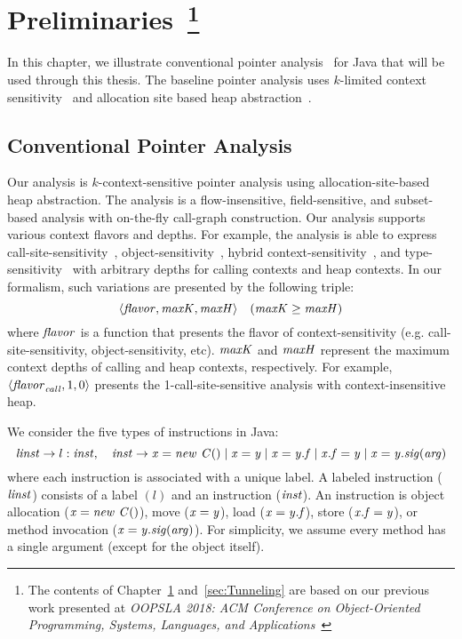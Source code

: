 \chapter{Preliminaries~\footnote{The contents of Chapter~\ref{sec:Preliminaries} and~\ref{sec:Tunneling} are based on our previous work presented at \emph{OOPSLA 2018: ACM Conference on Object-Oriented Programming, Systems, Languages, and Applications}~\cite{JeJeOh18}}}\label{sec:Preliminaries}
In this chapter, we illustrate conventional pointer analysis~\cite{Smaragdakis2015,KastrinisS13a} for Java that will be used through this thesis. 
The baseline pointer analysis uses $k$-limited context sensitivity~\cite{KastrinisS13a,Smaragdakis2011} and allocation site based heap abstraction~\cite{Smaragdakis2015,Tan2017}.



\section{Conventional Pointer Analysis}\label{pre:conventional-analysis}
Our analysis is $k$-context-sensitive pointer analysis using allocation-site-based heap abstraction.
The analysis is a flow-insensitive, field-sensitive, and subset-based
analysis with on-the-fly call-graph construction. 
Our analysis supports various context flavors and depths.
For example, the analysis is able to express
call-site-sensitivity~\cite{Shivers1988},
object-sensitivity~\cite{Milanova2005}, hybrid
context-sensitivity~\cite{KastrinisS13a}, and
type-sensitivity~\cite{Smaragdakis2011} with arbitrary depths for
calling contexts and heap contexts. In our formalism, such variations
are presented by the following triple:
\[
  \langle {\it flavor}, {\it maxK}, {\it maxH} \rangle \quad ({\it maxK} \ge {\it maxH})
\]
where ${\it flavor}$ is a function that presents the flavor of
context-sensitivity (e.g. call-site-sensitivity, object-sensitivity,
etc). ${\it maxK}$ and ${\it maxH}$ represent the maximum context depths
of calling and heap contexts, respectively. For example,
$\langle {\it flavor}_{\it call}, 1, 0 \rangle$ presents the 1-call-site-sensitive
analysis with context-insensitive heap. 


We consider the five types of instructions in Java:
\[
  {\it linst} \to l: {\it inst}, \quad {\it inst} \to {\it x = new~C()} \mid {\it x = y}
  \mid {\it x = y.f} \mid {\it x.f = y} \mid {\it x = y.sig(arg)}
\]
where each instruction is associated with a unique label.  A labeled
instruction (${\it linst}$) consists of a label $(l)$ and an instruction
(${\it inst}$). An instruction is object allocation (${\it x = new~C()}$),
move (${\it x = y}$), load (${\it x=y.{\it f}}$), store
(${\it x.{\it f} = y}$), or method invocation (${\it
  x=y.{\it sig}(arg)}$). For simplicity, we assume every method has a
single argument (except for the object itself).

